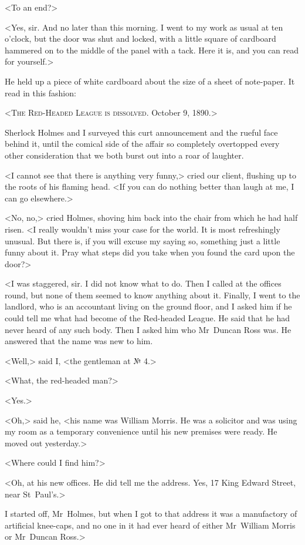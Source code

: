 <To an end?>

<Yes, sir. And no later than this morning. I went to my work as usual at ten o'clock, but the door was shut and locked, with a little square of cardboard hammered on to the middle of the panel with a tack. Here it is, and you can read for yourself.>

He held up a piece of white cardboard about the size of a sheet of note-paper. It read in this fashion:

<\textsc{The Red-Headed League is dissolved}. October 9, 1890.>

Sherlock Holmes and I surveyed this curt announcement and the rueful face behind it, until the comical side of the affair so completely overtopped every other consideration that we both burst out into a roar of laughter.

<I cannot see that there is anything very funny,> cried our client, flushing up to the roots of his flaming head. <If you can do nothing better than laugh at me, I can go elsewhere.>

<No, no,> cried Holmes, shoving him back into the chair from which he had half risen. <I really wouldn't miss your case for the world. It is most refreshingly unusual. But there is, if you will excuse my saying so, something just a little funny about it. Pray what steps did you take when you found the card upon the door?>

<I was staggered, sir. I did not know what to do. Then I called at the offices round, but none of them seemed to know anything about it. Finally, I went to the landlord, who is an accountant living on the ground floor, and I asked him if he could tell me what had become of the Red-headed League. He said that he had never heard of any such body. Then I asked him who Mr~Duncan Ross was. He answered that the name was new to him.

<Well,> said I, <the gentleman at № 4.>

<What, the red-headed man?>

<Yes.>

<Oh,> said he, <his name was William Morris. He was a solicitor and was using my room as a temporary convenience until his new premises were ready. He moved out yesterday.>

<Where could I find him?>

<Oh, at his new offices. He did tell me the address. Yes, 17 King Edward Street, near St~Paul's.>

I started off, Mr~Holmes, but when I got to that address it was a manufactory of artificial knee-caps, and no one in it had ever heard of either Mr~William Morris or Mr~Duncan Ross.>

